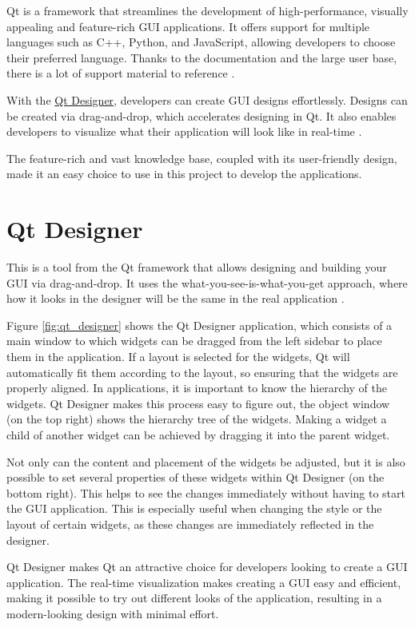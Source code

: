 Qt is a framework that streamlines the development of high-performance, visually appealing and feature-rich GUI applications. It offers support for multiple languages such as C++, Python, and JavaScript, allowing developers to choose their preferred language. Thanks to the documentation and the large user base, there is a lot of support material to reference \cite{qt}.

With the \hyperref[sub:qt_designer]{Qt Designer}, developers can create GUI designs effortlessly. Designs can be created via drag-and-drop, which accelerates designing in Qt. It also enables developers to visualize what their application will look like in real-time \cite{qt}.

The feature-rich and vast knowledge base, coupled with its user-friendly design, made it an easy choice to use in this project to develop the applications.


\section{Qt Designer}
\label{sub:qt_designer}

This is a tool from the Qt framework that allows designing and building your GUI via drag-and-drop. It uses the what-you-see-is-what-you-get approach, where how it looks in the designer will be the same in the real application \cite{qt}.

Figure \ref{fig:qt_designer} shows the Qt Designer application, which consists of a main window to which widgets can be dragged from the left sidebar to place them in the application. If a layout is selected for the widgets, Qt will automatically fit them according to the layout, so ensuring that the widgets are properly aligned. In applications, it is important to know the hierarchy of the widgets. Qt Designer makes this process easy to figure out, the object window (on the top right) shows the hierarchy tree of the widgets. Making a widget a child of another widget can be achieved by dragging it into the parent widget. 

Not only can the content and placement of the widgets be adjusted, but it is also possible to set several properties of these widgets within Qt Designer (on the bottom right). This helps to see the changes immediately without having to start the GUI application. This is especially useful when changing the style or the layout of certain widgets, as these changes are immediately reflected in the designer.

Qt Designer makes Qt an attractive choice for developers looking to create a GUI application. The real-time visualization makes creating a GUI easy and efficient, making it possible to try out different looks of the application, resulting in a modern-looking design with minimal effort.

